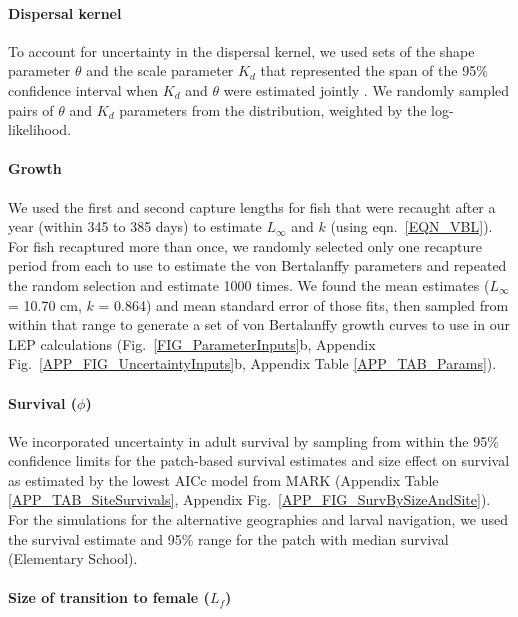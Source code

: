 \documentclass[12pt, oneside]{article}   	%
\begin{document}
\paragraph*{Dispersal kernel} %

To account for uncertainty in the dispersal kernel, we used sets of the shape parameter $\theta$ and the scale parameter $K_d$ that represented the span of the 95\% confidence interval when $K_d$ and $\theta$ were estimated jointly \citep[Table \ref{APP_TAB_Params}, Fig.\ \ref{FIG_ParameterInputs}a,][]{catalanoInPrepconnectivity}. We randomly sampled pairs of $\theta$ and $K_d$ parameters from the distribution, weighted by the log-likelihood.

\paragraph*{Growth} %

We used the first and second capture lengths for fish that were recaught after a year (within 345 to 385 days) to estimate $L_\infty$ and $k$ (using eqn.\ \ref{EQN_VBL}). For fish recaptured more than once, we randomly selected only one recapture period from each to use to estimate the von Bertalanffy parameters and repeated the random selection and estimate 1000 times. We found the mean estimates ($L_\infty$ = 10.70 cm, $k$ = 0.864) and mean standard error of those fits, then sampled from within that range to generate a set of von Bertalanffy growth curves to use in our LEP calculations (Fig.\ \ref{FIG_ParameterInputs}b, Appendix Fig.\ \ref{APP_FIG_UncertaintyInputs}b, Appendix Table \ref{APP_TAB_Params}).

\paragraph*{Survival ($\phi$)} %

We incorporated uncertainty in adult survival by sampling from within the 95\% confidence limits for the patch-based survival estimates and size effect on survival as estimated by the lowest AICc model from MARK (Appendix Table \ref{APP_TAB_SiteSurvivals}, Appendix Fig.\ \ref{APP_FIG_SurvBySizeAndSite}). For the simulations for the alternative geographies and larval navigation, we used the survival estimate and 95\% range for the patch with median survival (Elementary School).

\paragraph*{Size of transition to female ($L_f$)} %
\end{document}
